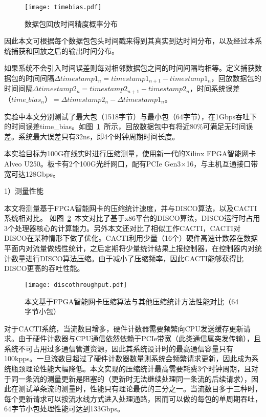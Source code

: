 \begin{figure}[!ht]
	\centering 
	\vspace{-1.5mm} 
	\texttt{[image: timebias.pdf]}
	\caption{数据包回放时间精度概率分布} \label{fig:timebias}
\end{figure}

因此本文可根据每个数据包包头时间戳来得到其真实到达时间分布，以及经过本系统捕获和回放之后的输出时间分布。

如果系统不会引入时间误差则每对相邻数据包之间的时间间隔均相等。定义捕获数据包的时间间隔$ \Delta timestamp1_n = timestamp1_{n+1} - timestamp1_{n} $，回放数据包的时间间隔$ \Delta timestamp2_n = timestamp2_{n+1} - timestamp2_{n} $，时间系统误差$ （time\_bias_n）=\Delta timestamp2_n - \Delta timestamp1_n $。



实验中本文分别测试了最大包（1518字节）与最小包（64字节），在1Gbps吞吐下的时间误差time\_bias。如图~\ref{fig:timebias}~所示，回放数据包中有将近80\%可满足无时间误差。系统最大误差只有32ns，即4个时钟周期时间长度。


\label{chap372}

本实验目标为100G在线实时进行压缩测量，使用新一代的Xilinx FPGA智能网卡Alveo U250。板卡有2个100G光纤网口，配有PCIe Gen3$ \times $16，与主机互通接口带宽可达128Gbps。

1）测量性能

本文将测量基于FPGA智能网卡的压缩统计速度，并与DISCO算法，以及CACTI系统相对比。 如图~\ref{fig:discothroughput}~本文对比了基于x86平台的DISCO算法，DISCO运行时占用3个处理器核心的计算能力。另外本文还对比了相似工作CACTI，CACTI对DISCO在某种情形下做了优化。CACTI利用少量（16个）硬件高速计数器在数据平面内对流量做线性统计，之后定期将少量统计结果上报控制器，在控制器内对统计数量进行DISCO算法压缩。由于减小了压缩频率，因此CACTI能够获得比DISCO更高的吞吐性能。

\begin{figure}[!ht]
	\centering 
	\vspace{-1.5mm} 
	\texttt{[image: discothroughput.pdf]}
	\caption{本文基于FPGA智能网卡压缩算法与其他压缩统计方法性能对比（64字节小包）} \label{fig:discothroughput}
\end{figure}

对于CACTI系统，当流数目增多，硬件计数器需要频繁向CPU发送缓存更新请求。由于硬件计数器与CPU通信依然依赖于PCIe带宽（此类通信属突发传输），且系统不可占用过多通信管道资源，因此其系统设计时的最高通信容量只有100kpps。一旦流数目超过了硬件计数器数量则系统会频繁请求更新，因此成为系统瓶颈理论性能大幅降低。本文实现的压缩统计最高需要耗费3个时钟周期，且对于同一条流的测量更新是阻塞的（更新时无法继续处理同一条流的后续请求），因此在测试单条流的测量时，性能只有理论最优的三分之一。当流数目多于三种时，每个更新请求可以按流水线方式进入处理通路，因而可以做的每包的单周期吞吐，64字节小包处理性能可达到133Gbps。


